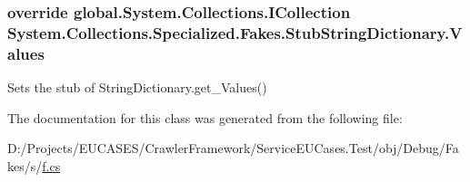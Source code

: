 \hypertarget{class_system_1_1_collections_1_1_specialized_1_1_fakes_1_1_stub_string_dictionary_a08aecd11c380d92455e0cd33245cafc1}{
\subsubsection[{Values}]{\setlength{\rightskip}{0pt plus 5cm}override global.\-System.\-Collections.\-I\-Collection System.\-Collections.\-Specialized.\-Fakes.\-Stub\-String\-Dictionary.\-Values\hspace{0.3cm}{\ttfamily [get]}}}\label{class_system_1_1_collections_1_1_specialized_1_1_fakes_1_1_stub_string_dictionary_a08aecd11c380d92455e0cd33245cafc1}


Sets the stub of String\-Dictionary.\-get\-\_\-\-Values()



The documentation for this class was generated from the following file\-:\begin{DoxyCompactItemize}
\item 
D\-:/\-Projects/\-E\-U\-C\-A\-S\-E\-S/\-Crawler\-Framework/\-Service\-E\-U\-Cases.\-Test/obj/\-Debug/\-Fakes/s/\hyperlink{s_2f_8cs}{f.\-cs}\end{DoxyCompactItemize}
